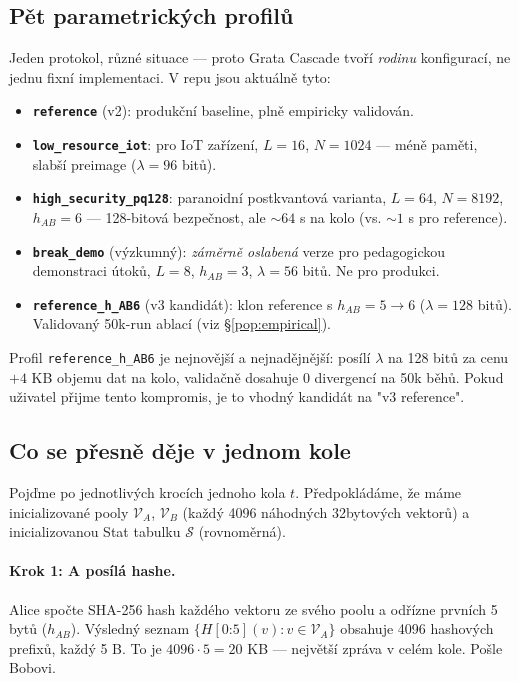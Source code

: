 \documentclass[11pt,a4paper]{article}
\begin{document}
\subsection{Pět parametrických profilů}

Jeden protokol, různé situace --- proto Grata Cascade tvoří \emph{rodinu} konfigurací, ne jednu fixní implementaci. V repu jsou aktuálně tyto:

\begin{itemize}[leftmargin=*]
\item \textbf{\texttt{reference}} (v2): produkční baseline, plně empiricky validován.
\item \textbf{\texttt{low\_resource\_iot}}: pro IoT zařízení, $L = 16$, $N = 1024$ --- méně paměti, slabší preimage ($\lambda = 96$ bitů).
\item \textbf{\texttt{high\_security\_pq128}}: paranoidní postkvantová varianta, $L = 64$, $N = 8192$, $h_{AB} = 6$ --- 128-bitová bezpečnost, ale $\sim 64$ s na kolo (vs. $\sim 1$ s pro reference).
\item \textbf{\texttt{break\_demo}} (výzkumný): \emph{záměrně oslabená} verze pro pedagogickou demonstraci útoků, $L = 8$, $h_{AB} = 3$, $\lambda = 56$ bitů. Ne pro produkci.
\item \textbf{\texttt{reference\_h\_AB6}} (v3 kandidát): klon reference s $h_{AB} = 5 \to 6$ ($\lambda = 128$ bitů). Validovaný 50k-run ablací (viz §\ref{pop:empirical}).
\end{itemize}

Profil \texttt{reference\_h\_AB6} je nejnovější a nejnadějnější: posílí $\lambda$ na 128 bitů za cenu $+4$ KB objemu dat na kolo, validačně dosahuje 0 divergencí na 50k běhů. Pokud uživatel přijme tento kompromis, je to vhodný kandidát na "v3 reference".

\subsection{Co se přesně děje v jednom kole}\label{pop:round-walkthrough}

Pojďme po jednotlivých krocích jednoho kola $t$. Předpokládáme, že máme inicializované pooly $\mathcal{V}_A$, $\mathcal{V}_B$ (každý 4096 náhodných 32bytových vektorů) a inicializovanou Stat tabulku $\mathcal{S}$ (rovnoměrná).

\paragraph{Krok 1: A posílá hashe.}
Alice spočte SHA-256 hash každého vektoru ze svého poolu a odřízne prvních 5 bytů ($h_{AB}$). Výsledný seznam $\{H[0\mathord{:}5](v) : v \in \mathcal{V}_A\}$ obsahuje 4096 hashových prefixů, každý 5 B. To je $4096 \cdot 5 = 20$ KB --- největší zpráva v celém kole. Pošle Bobovi.
\end{document}
